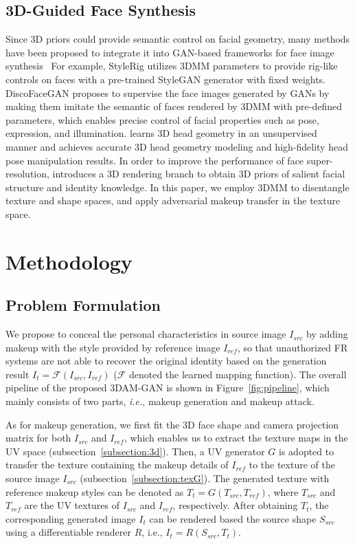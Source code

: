 \documentclass[10pt,journal,compsoc]{IEEEtran}
\begin{document}
\subsection{3D-Guided Face Synthesis}
Since 3D priors could provide semantic control on facial geometry, many methods have been proposed to integrate it into GAN-based frameworks for face image synthesis~\cite{tewari2020stylerig,deng2020disentangled,xu2020deep,hu2020face}
For example, StyleRig \cite{tewari2020stylerig} utilizes 3DMM parameters to provide rig-like controls on faces with a pre-trained StyleGAN generator with fixed weights. DiscoFaceGAN \cite{deng2020disentangled} proposes to supervise the face images generated by GANs by making them imitate the semantic of faces rendered by 3DMM with pre-defined parameters, which enables precise control of facial properties such as pose, expression, and illumination. \cite{xu2020deep} learns 3D head geometry in an unsupervised manner and achieves accurate 3D head geometry modeling and high-fidelity head pose manipulation results.
In order to improve the performance of face super-resolution, \cite{hu2020face} introduces a 3D rendering branch to obtain 3D priors of salient facial structure and identity knowledge.
In this paper, we employ 3DMM to disentangle texture and shape spaces, and apply adversarial makeup transfer in the texture space.

\section{Methodology}
\label{sec:method}

\subsection{Problem Formulation}
We propose to conceal the personal characteristics in source image $I_{src}$ by adding makeup with the style provided by reference image $I_{ref}$, so that unauthorized FR systems are not able to recover the original identity based on the generation result $I_{t} = \mathcal{F}\left(I_{src}, I_{ref}\right)$ ($\mathcal{F}$ denoted the learned mapping function). The overall pipeline of the proposed 3DAM-GAN is shown in Figure~\ref{fig:pipeline}, which mainly consists of two parts, \emph{i.e.}, makeup generation and makeup attack.

As for makeup generation, we first fit the 3D face shape and camera projection matrix for both $I_{src}$ and $I_{ref}$, which enables us to extract the texture maps in the UV space (subsection~\ref{subsection:3d}). Then, a UV generator $G$ is adopted to transfer the texture containing the makeup details of $I_{ref}$ to the texture of the source image $I_{src}$ (subsection~\ref{subsection:texG}). The generated texture with reference makeup styles can be denoted as $T_{t}=G(T_{src},T_{ref})$, where $T_{src}$ and $T_{ref}$ are the UV textures of $I_{src}$ and $I_{ref}$, respectively. After obtaining $T_{t}$, the corresponding generated image $I_{t}$ can be rendered based the source shape $S_{src}$ using a differentiable renderer $R$, i.e., $I_{t}=R(S_{src}, T_{t})$.
\end{document}
